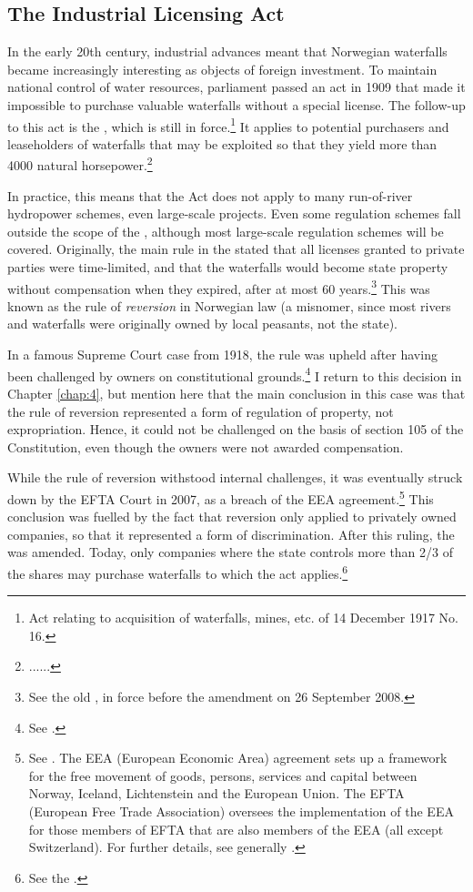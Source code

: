 \subsection{The Industrial Licensing Act}\label{sec:ica17}

In the early 20th century, industrial advances meant that Norwegian waterfalls became increasingly interesting as objects of foreign investment. To maintain national control of water resources, parliament passed an act in 1909 that made it impossible to purchase valuable waterfalls without a special license. The follow-up to this act is the \cite{ica17}, which is still in force.\footnote{Act relating to acquisition of waterfalls, mines, etc. of 14 December 1917 No. 16.} It applies to potential purchasers and leaseholders of waterfalls that may be exploited so that they yield more than 4000 natural horsepower.\footnote{......}

In practice, this means that the Act does not apply to many run-of-river hydropower schemes, even large-scale projects. Even some regulation schemes fall outside the scope of the \cite{ica17}, although most large-scale regulation schemes will be covered. Originally, the main rule in the \cite{ica17} stated that all licenses granted to private parties were time-limited, and that the waterfalls would become state property without compensation when they expired, after at most 60 years.\footnote{See the old \cite[2]{ica17}, in force before the amendment on 26 September 2008.} This was known as the rule of {\it reversion} in Norwegian law (a misnomer, since most rivers and waterfalls were originally owned by local peasants, not the state).

In a famous Supreme Court case from 1918, the rule was upheld after having been challenged by owners on constitutional grounds.\footnote{See \cite{johansen18}.} I return to this decision in Chapter \ref{chap:4}, but mention here that the main conclusion in this case was that the rule of reversion represented a form of regulation of property, not expropriation. Hence, it could not be challenged on the basis of section 105 of the Constitution, even though the owners were not awarded compensation.

While the rule of reversion withstood internal challenges, it was eventually struck down by the EFTA Court in 2007, as a breach of the EEA agreement.\footnote{See \cite{efta07}. The EEA (European Economic Area) agreement sets up a framework for the free movement of goods, persons, services and capital between Norway, Iceland, Lichtenstein and the European Union. The EFTA (European Free Trade Association) oversees the implementation of the EEA for those members of EFTA that are also members of the EEA (all except Switzerland). For further details, see generally \cite{bull94,magnussen02,fredriksen09}.} This conclusion was fuelled by the fact that reversion only applied to privately owned companies, so that it represented a form of discrimination. After this ruling, the \cite{ica17} was amended. Today, only companies where the state controls more than 2/3 of the shares may purchase waterfalls to which the act applies.\footnote{See the \cite[2]{ica17}.}

